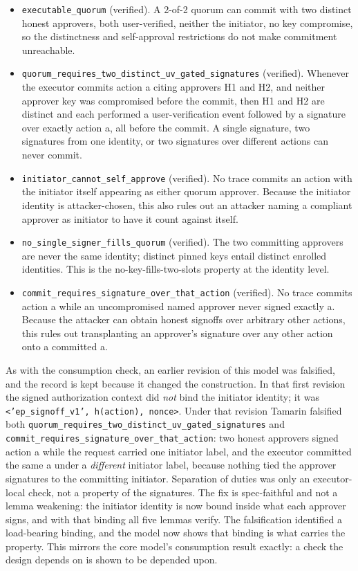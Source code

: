 \documentclass[11pt]{article}
\newcommand{\code}[1]{\texttt{#1}}
\begin{document}
\begin{itemize}[leftmargin=*]
\item \code{executable\_quorum} (verified). A 2-of-2 quorum can commit with two
distinct honest approvers, both user-verified, neither the initiator, no key
compromise, so the distinctness and self-approval restrictions do not make
commitment unreachable.
\item \code{quorum\_requires\_two\_distinct\_uv\_gated\_signatures} (verified).
Whenever the executor commits action a citing approvers H1 and H2, and neither
approver key was compromised before the commit, then H1 and H2 are distinct and
each performed a user-verification event followed by a signature over exactly
action a, all before the commit. A single signature, two signatures from one
identity, or two signatures over different actions can never commit.
\item \code{initiator\_cannot\_self\_approve} (verified). No trace commits an
action with the initiator itself appearing as either quorum approver. Because the
initiator identity is attacker-chosen, this also rules out an attacker naming a
compliant approver as initiator to have it count against itself.
\item \code{no\_single\_signer\_fills\_quorum} (verified). The two committing
approvers are never the same identity; distinct pinned keys entail distinct
enrolled identities. This is the no-key-fills-two-slots property at the identity
level.
\item \code{commit\_requires\_signature\_over\_that\_action} (verified). No trace
commits action a while an uncompromised named approver never signed exactly a.
Because the attacker can obtain honest signoffs over arbitrary other actions, this
rules out transplanting an approver's signature over any other action onto a
committed a.
\end{itemize}

As with the consumption check, an earlier revision of this model was falsified, and
the record is kept because it changed the construction. In that first revision the
signed authorization context did \emph{not} bind the initiator identity; it was
\code{<'ep\_signoff\_v1', h(action), nonce>}. Under that revision Tamarin falsified
both \code{quorum\_requires\_two\_distinct\_uv\_gated\_signatures} and
\code{commit\_requires\_signature\_over\_that\_action}: two honest approvers signed
action a while the request carried one initiator label, and the executor committed
the same a under a \emph{different} initiator label, because nothing tied the
approver signatures to the committing initiator. Separation of duties was only an
executor-local check, not a property of the signatures. The fix is spec-faithful
and not a lemma weakening: the initiator identity is now bound inside what each
approver signs, and with that binding all five lemmas verify. The falsification
identified a load-bearing binding, and the model now shows that binding is what
carries the property. This mirrors the core model's consumption result exactly: a
check the design depends on is shown to be depended upon.
\end{document}
